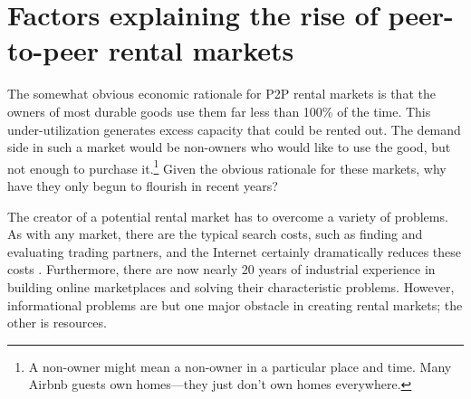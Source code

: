 \documentclass[11pt]{article}
\begin{document}
 



\section{Factors explaining the rise of peer-to-peer rental markets}

The somewhat obvious economic rationale for P2P rental markets is that the owners of most durable goods use them far less than 100\% of the time.
This under-utilization generates excess capacity that could be rented out.
The demand side in such a market would be non-owners who would like to use the good, but not enough to purchase it.\footnote{
A non-owner might mean a non-owner in a particular place and time. 
Many Airbnb guests own homes---they just don't own homes everywhere. 
} 
Given the obvious rationale for these markets, why have they only begun to flourish in recent years? 

The creator of a potential rental market has to overcome a variety of problems. 
As with any market, there are the typical search costs, such as finding and evaluating trading partners, and the Internet certainly dramatically reduces these costs \citep{bakos1997reducing}.
Furthermore, there are now nearly 20 years of industrial experience in building online marketplaces and solving their characteristic problems. 
However, informational problems are but one major obstacle in creating rental markets; the other is resources. 

\end{document}
